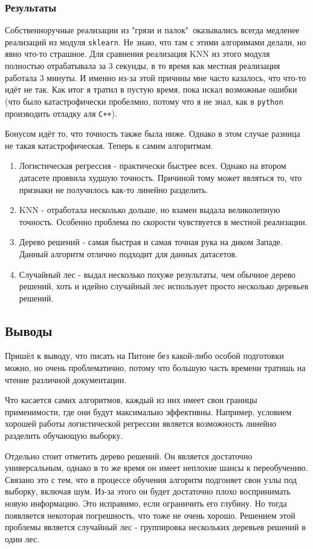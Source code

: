 \documentclass[12pt]{article}
\begin{document}
    \subsubsection*{Результаты}
    
    Собственноручные реализации из "грязи и палок"\ оказывались всегда медленее реализаций из модуля {\tt sklearn}. Не знаю, что там с этими алгоримами делали, но явно что-то страшное. Для сравнения реализация KNN из этого модуля полностью отрабатывала за 3 секунды, в то время как местная реализация работала 3 минуты. И именно из-за этой причины мне часто казалось, что что-то идёт не так. Как итог я тратил в пустую время, пока искал возможные ошибки (что было катастрофически пробелмно, потому что я не знал, как в {\tt python} производить отладку аля {\tt C++}).
    
    Бонусом идёт то, что точность также была ниже. Однако в этом случае разница не такая катастрофическая. Теперь к самим алгоритмам.
    
    \begin{enumerate}
        \item Логистическая регрессия - практически быстрее всех. Однако на втором датасете проявила худшую точность. Причиной тому может являться то, что признаки не получилось как-то линейно разделить.
        \item KNN - отработала несколько дольше, но взамен выдала великолепную точность. Особенно проблема по скорости чувствуется в местной реализации.
        \item Дерево решений - самая быстрая и самая точная рука на диком Западе. Данный алгоритм отлично подходит для данных датасетов.
        \item Случайный лес - выдал несколько похуже результаты, чем обычное дерево решений, хоть и идейно случайный лес использует просто несколько деревьев решений.
    \end{enumerate}
	\subsection*{Выводы}
	
	Пришёл к выводу, что писать на Питоне без какой-либо особой подготовки можно, но очень проблематично, потому что большую часть времени тратишь на чтение различной документации.
	
	Что касается самих алгоритмов, каждый из них имеет свои границы применимости, где они будут максимально эффективны. Например, условием хорошей работы логистической регрессии является возможность линейно разделить обучающую выборку. 
	
	Отдельно стоит отметить дерево решений. Он является достаточно универсальным, однако в то же время он имеет неплохие шансы к переобучению. Связано это с тем, что в процессе обучения алгоритм подгоняет свои узлы под выборку, включая шум. Из-за этого он будет достаточно плохо воспринимать новую информацию. Это исправимо, если ограничить его глубину. Но тогда появляется некоторая погрешность, что тоже не очень хорошо. Решением этой проблемы является случайный лес - группировка нескольких деревьев решений в один лес.
	
\end{document}
